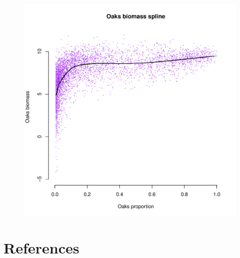 \documentclass[authoryear, review, 11pt]{elsarticle}
\begin{document}
\begin{figure}
	\begin{center}
	\includegraphics[width=5in]{../../figures/Oaks-biomass-spline.pdf}
	\caption{\label{fig:oaks-biomass-spline}}
	\end{center}
\end{figure}

\section{References}
%
%
\end{document}

